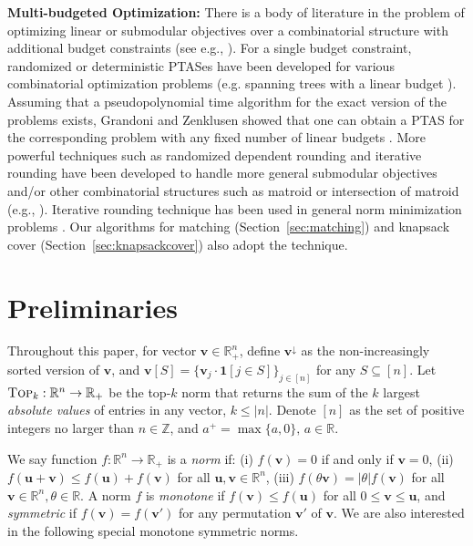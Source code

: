 \documentclass[11pt,a4paper]{article} \usepackage{enumitem}
\newcommand{\da}{\downarrow}
\newcommand{\boldu}{\boldsymbol{u}}
\newcommand{\boldv}{\boldsymbol{v}}
\newcommand{\bbone}{\mathbf{1}}
\newcommand{\norm}{f}
\newcommand{\topp}[1]{\textsc{Top}_{#1}}
\newcommand{\Z}{\mathbb{Z}}
\newcommand{\R}{\mathbb{R}}
\newcommand{\Rpos}{\mathbb{R}_+}
\theoremstyle{definition}
\begin{document}
\vspace{0.2cm}
\noindent
{\bf Multi-budgeted Optimization:}
There is a body of literature in the problem of optimizing linear or 
submodular objectives over a combinatorial structure with
additional budget constraints 
(see e.g., \cite{ravi1996constrained,camerini1992random,grandoni2009iterative,grandoni2010approximation,chekuri2011multi,berger2011budgeted,grandoni2014new}).
For a single budget constraint,
randomized or deterministic PTASes
have been developed for various combinatorial optimization problems
(e.g. spanning trees with a linear budget \cite{ravi1996constrained}). 
Assuming that a pseudopolynomial time algorithm for the exact version of the problems exists, Grandoni and Zenklusen showed that one can obtain a
PTAS for the corresponding problem with any fixed number of linear budgets \cite{grandoni2010approximation}.
More powerful techniques such as randomized dependent rounding and iterative rounding
have been developed to handle more general submodular objectives and/or other combinatorial structures such as matroid or intersection of matroid
(e.g., \cite{grandoni2009iterative,grandoni2010approximation,chekuri2011multi,grandoni2014new}).
Iterative rounding technique \cite{grandoni2009iterative,linhares2020approximate}
has been used in general norm minimization problems \cite{chakrabarty2019approximation,chakrabarty2019simpler}. Our algorithms for matching
(Section~\ref{sec:matching}) and knapsack cover (Section~\ref{sec:knapsackcover}) also adopt the technique.





 
\section{Preliminaries}
\label{section:preliminary}

Throughout this paper, for vector $\boldv\in\Rpos^n$, define $\boldv^\da$ as the non-increasingly sorted version of $\boldv$, and $\boldv[S]=\{\boldv_j\cdot\bbone[j\in S]\}_{j\in [n]}$ for any $S\subseteq [n]$.
Let $\topp{k}:\R^n\rightarrow\Rpos$ be the top-$k$ norm that returns the sum of the $k$ largest \emph{absolute values} of entries in any vector, $k\leq |n|$.
Denote $[n]$ as the set of positive integers no larger than $n\in\Z$, and $a^+=\max\{a,0\},\,a\in\R$. 


We say function $\norm:\R^n\rightarrow\Rpos$ is a {\em norm} if: 
(i) $\norm(\boldv)=0$ if and only if $\boldv=0$, 
(ii) $\norm(\boldu+\boldv)\leq\norm(\boldu)+\norm(\boldv)$ for all $\boldu,\boldv\in\R^n$, 
(iii) $\norm(\theta\boldv)=|\theta|\norm(\boldv)$ for all $\boldv\in\R^n,\theta\in\R$. 
A norm $\norm$ is {\em monotone} if $\norm(\boldv)\leq\norm(\boldu)$ for all $0\leq\boldv\leq\boldu$, and {\em symmetric} if $\norm(\boldv)=\norm(\boldv')$ for any permutation $\boldv'$ of $\boldv$. 
We are also interested in the following special monotone symmetric norms.
\end{document}
